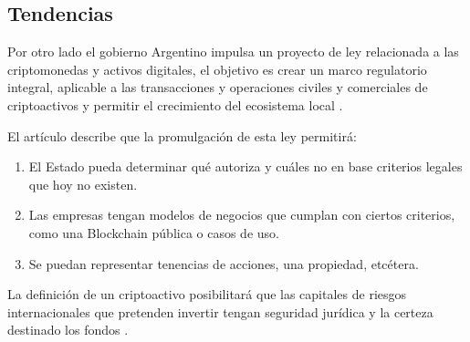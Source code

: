 \subsection{Tendencias}
Por otro lado el gobierno Argentino impulsa un proyecto de ley relacionada a las criptomonedas y activos digitales,
el objetivo es crear un marco regulatorio integral, aplicable a las transacciones y operaciones civiles y 
comerciales de criptoactivos  y permitir
el crecimiento del ecosistema local  \cite[]{dagostino_exclusivo_nodate}.

El artículo describe que la promulgación de esta ley permitirá:
\begin{enumerate}
    \item El Estado pueda determinar qué  autoriza y cuáles no en base criterios legales que hoy no existen.

    \item Las empresas tengan modelos de negocios que cumplan con ciertos criterios, como una  Blockchain pública o casos de uso.

    \item Se puedan representar tenencias de acciones, una propiedad, etcétera.

\end{enumerate}

La definición de un criptoactivo posibilitará que las capitales de riesgos internacionales 
que pretenden invertir tengan  seguridad jurídica y la certeza destinado los fondos \cite[]{dagostino_exclusivo_nodate}. 

